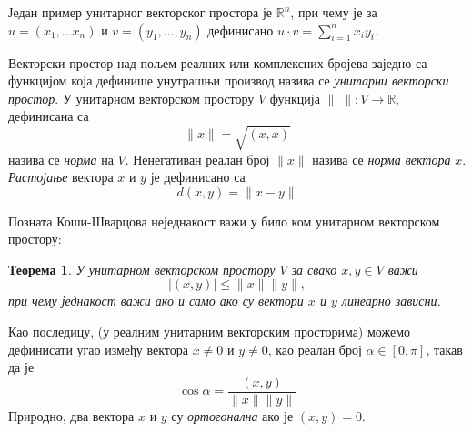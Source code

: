 \documentclass{report}
\theoremstyle{plain}
\newtheorem{thm}{Теорема}
\theoremstyle{definition}
\begin{document}
Један пример унитарног векторског простора је $\mathbb{R}^n$, при чему је за $u = (x_1, ...x_n)$ и $v = (y_1, ..., y_n)$ дефинисано $u\cdot v = \sum_{i=1}^n x_iy_i$.

Векторски простор над пољем реалних или комплексних бројева заједно са функцијом која дефинише унутрашњи производ назива се \emph{унитарни векторски простор}.
У унитарном векторском простору $V$ функција $\|\;\|:V\to \mathbb{R}$, дефинисана са $$\|x\| = \sqrt{(x, x)}$$ назива се \emph{норма} на $V$. Ненегативан реалан број $\|x\|$ назива се \emph{норма вектора} $x$.
\emph{Растојање} вектора $x$ и $y$ је дефинисано са $$d(x, y) = \|x-y\|$$

Позната Коши-Шварцова неједнакост важи у било ком унитарном векторском простору:
\begin{thm}
У унитарном векторском простору $V$ за свако $x, y\in V$ важи
$$|(x, y)|\leq\|x\|\|y\|,$$
при чему једнакост важи ако и само ако су вектори $x$ и $y$ линеарно зависни.
\end{thm}
Као последицу, (у реалним унитарним векторским просторима) можемо дефинисати угао између вектора $x\neq 0$ и $y\neq 0$, као реалан број $\alpha\in [0, \pi]$, такав да је $$\cos \alpha = \frac{(x, y)}{\|x\|\|y\|}$$
Природно, два вектора $x$ и $y$ су \emph{ортогонална} ако је $(x, y) = 0$.
\end{document}
